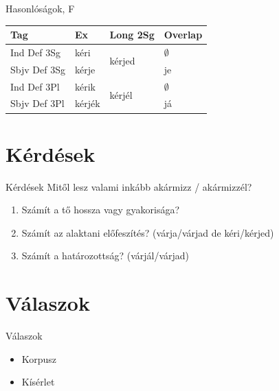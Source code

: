 \begin{frame}{Hasonlóságok, F}
\protect{}\label{hasonluxf3suxe1gok-f}
\begin{table}
\centering
\begin{tabular}{llll}
\toprule
\textbf{Tag} & \textbf{Ex} & \textbf{Long 2Sg} & \textbf{Overlap} \\
\midrule
Ind Def 3Sg & kéri & \multirow{2}{*}{kérjed} & $\emptyset{}$ \\
Sbjv Def 3Sg & kérje & & je \\
Ind Def 3Pl & kérik & \multirow{2}{*}{kérjél} & $\emptyset{}$ \\
Sbjv Def 3Pl & kérjék & & já \\
\bottomrule
\end{tabular}
\end{table}
\end{frame}

\section{Kérdések}\label{kuxe9rduxe9sek}

\begin{frame}{Kérdések}
Mitől lesz valami inkább akármizz / akármizzél?

\begin{enumerate}
\tightlist
\item
  Számít a tő hossza vagy gyakorisága?
\item
  Számít az alaktani előfeszítés? (várja/várjad de kéri/kérjed)
\item
  Számít a határozottság? (várjál/várjad)
\end{enumerate}
\end{frame}

\section{Válaszok}\label{vuxe1laszok}

\begin{frame}{Válaszok}
\begin{itemize}
\tightlist
\item
  Korpusz
\item
  Kísérlet
\end{itemize}
\end{frame}

